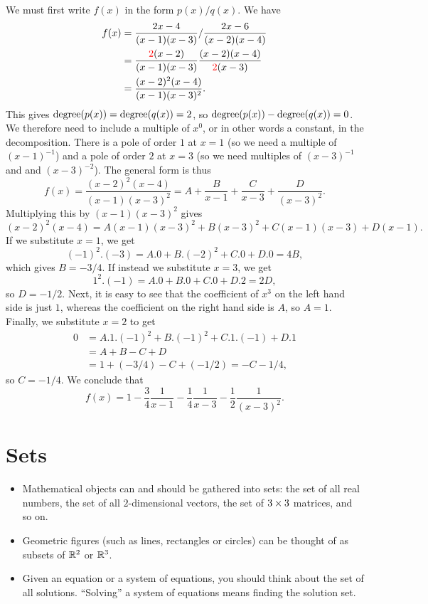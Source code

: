 \documentclass[a4paper]{book}
\theoremstyle{definition}
\renewenvironment{solution}{\SolutionInline}{\endSolutionInline}
\begin{document}
\begin{solution}
 We must first write $f(x)$ in the form $p(x)/q(x)$.  We have 
 \begin{align*}
  f(x) &= \frac{2x-4}{(x-1)(x-3)} / \frac{2x-6}{(x-2)(x-4)} \\
       &= \frac{{\color{red}2}(x-2)}{(x-1)(x-3)}
          \frac{(x-2)(x-4)}{{\color{red}2}(x-3)} \\
       &= \frac{(x-2)^2(x-4)}{(x-1)(x-3)^2}.
 \end{align*}
 This gives $\operatorname{degree}(p(x))=\operatorname{degree}(q(x))=2$, so
 $\operatorname{degree}(p(x))-\operatorname{degree}(q(x))=0$.  We therefore need to include a
 multiple of $x^0$, or in other words a constant, in the
 decomposition.  There is a pole of order $1$ at $x=1$ (so we need a
 multiple of $(x-1)^{-1}$) and a pole of order $2$ at $x=3$ (so we
 need multiples of $(x-3)^{-1}$ and and $(x-3)^{-2}$).  The general
 form is thus
 \[ f(x)= \frac{(x-2)^2(x-4)}{(x-1)(x-3)^2} = 
    A + \frac{B}{x-1} + \frac{C}{x-3} + \frac{D}{(x-3)^2}.
 \]
 Multiplying this by $(x-1)(x-3)^2$ gives
 \[ (x-2)^2(x-4) = A(x-1)(x-3)^2 + B(x-3)^2 + C(x-1)(x-3) + D(x-1). \]
 If we substitute $x=1$, we get 
 \[ (-1)^2.(-3) = A.0 + B.(-2)^2 + C.0 + D.0 = 4B, \]
 which gives $B=-3/4$.  If instead we substitute $x=3$, we get 
 \[ 1^2.(-1) = A.0 + B.0 + C.0 + D.2 = 2D, \]
 so $D=-1/2$.  Next, it is easy to see that the coefficient of $x^3$
 on the left hand side is just $1$, whereas the coefficient on the
 right hand side is $A$, so $A=1$.  Finally, we substitute $x=2$ to
 get 
 \begin{align*}
   0 &= A.1.(-1)^2 + B.(-1)^2 + C.1.(-1) + D.1 \\
     &= A + B - C + D \\
     &= 1 + (-3/4) - C + (-1/2) = -C-1/4,
 \end{align*} 
 so $C=-1/4$.  We conclude that 
 \[ f(x) = 1 - \frac{3}{4}\frac{1}{x-1} 
             - \frac{1}{4}\frac{1}{x-3} 
             - \frac{1}{2}\frac{1}{(x-3)^2}.
 \] 
\end{solution}

\chapter{Sets}\label{chap-sets}

\begin{itemize}
 \item Mathematical objects can and should be gathered into sets:
  the set of all real numbers, the set of all $2$-dimensional vectors,
  the set of $3\times 3$ matrices, and so on.
 \item Geometric figures (such as lines, rectangles or circles) can be
  thought of as subsets of ${\mathbb{R}}^2$ or ${\mathbb{R}}^3$.
 \item Given an equation or a system of equations, you should think
  about the set of all solutions.  ``Solving'' a system of equations
  means finding the solution set.
\end{itemize}
\end{document}
